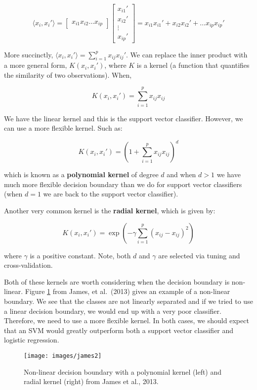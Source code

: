 \documentclass[
]{book}
\begin{document}
\[
\langle x_i, x_i'\rangle = \begin{bmatrix} 
x_{i1} x_{i2} \dots x_{ip}
\end{bmatrix} 
\begin{bmatrix} 
x_{i1}' \\
x_{i2}' \\
\vdots \\
x_{ip}'
\end{bmatrix} = x_{i1}x_{i1}' + x_{i2}x_{i2}' + \dots x_{ip}x_{ip}'
\]

More succinctly, \(\langle x_i, x_i'\rangle = \sum_{i = 1}^p x_{ij}x_{ij}'\). We can replace the inner product with a more general form, \(K(x_i, x_i')\), where \(K\) is a kernel (a function that quantifies the similarity of two observations). When,

\[
K(x_i, x_i') = \sum_{i = 1}^p x_{ij}x_{ij}
\]

We have the linear kernel and this is the support vector classifier. However, we can use a more flexible kernel. Such as:

\[
K(x_i, x_i') = (1 + \sum_{i = 1}^p x_{ij}x_{ij})^d
\]

which is known as a \textbf{polynomial kernel} of degree \(d\) and when \(d > 1\) we have much more flexible decision boundary than we do for support vector classifiers (when \(d = 1\) we are back to the support vector classifier).

Another very common kernel is the \textbf{radial kernel}, which is given by:

\[
K(x_i, x_i') = \exp\left(-\gamma \sum_{i = 1}^p (x_{ij} - x_{ij})^2\right)
\]

where \(\gamma\) is a positive constant. Note, both \(d\) and \(\gamma\) are selected via tuning and cross-validation.

Both of these kernels are worth considering when the decision boundary is non-linear. Figure \ref{fig:james2} from James, et al.~(2013) gives an example of a non-linear boundary. We see that the classes are not linearly separated and if we tried to use a linear decision boundary, we would end up with a very poor classifier. Therefore, we need to use a more flexible kernel. In both cases, we should expect that an SVM would greatly outperform both a support vector classifier and logistic regression.

\begin{figure}
\texttt{[image: images/james2]} \caption{Non-linear decision boundary with a polynomial kernel (left) and radial kernel (right) from James et al., 2013.}\label{fig:james2}
\end{figure}
\end{document}
